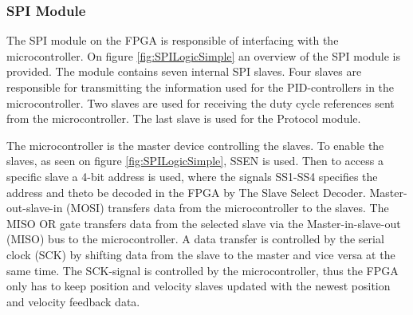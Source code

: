 \documentclass[../../main.tex]{subfiles}
\begin{document}







\subsubsection*{SPI Module}

The SPI module on the FPGA is responsible of interfacing with the microcontroller. On figure \ref{fig:SPILogicSimple} an overview of the SPI module is provided. The module contains seven internal SPI slaves. Four slaves are responsible for transmitting the information used for the PID-controllers in the microcontroller. Two slaves are used for receiving the duty cycle references sent from the microcontroller. The last slave is used for the Protocol module.

The microcontroller is the master device controlling the slaves. To enable the slaves, as seen on figure \ref{fig:SPILogicSimple}, SSEN is used. Then to access a specific slave a 4-bit address is used, where the signals SS1-SS4 specifies the address and theto be decoded in the FPGA by The Slave Select Decoder. Master-out-slave-in (MOSI) transfers data from the microcontroller to the slaves. The MISO OR gate transfers data from the selected slave via the Master-in-slave-out (MISO) bus to the microcontroller. A data transfer is controlled by the serial clock (SCK) by shifting data from the slave to the master and vice versa at the same time. The SCK-signal is controlled by the microcontroller, thus the FPGA only has to keep position and velocity slaves updated with the newest position and velocity feedback data. 
\end{document}
